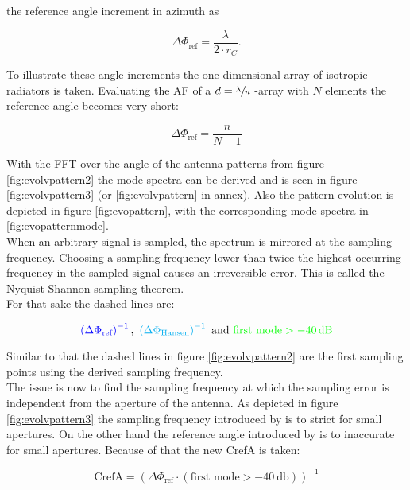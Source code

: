 the reference angle increment in azimuth as

\begin{equation}
\Delta\Phi_{\text{ref}} = \frac{\lambda}{2\cdot r_C}.
\end{equation}

To illustrate these angle increments the one dimensional array of isotropic radiators is taken. Evaluating the \ac{AF} of a $d = \sfrac{\lambda}{n}$ -array with $N$ elements the reference angle becomes very short:

\begin{equation}
\Delta\Phi_{\text{ref}} = \frac{n}{N-1}
\label{eq:1dinc}
\end{equation}

With the \ac{FFT} over the angle of the antenna patterns from figure \ref{fig:evolvpattern2} the mode spectra can be derived and is seen in figure \ref{fig:evolvpattern3} (or \ref{fig:evolvpattern} in annex). Also the pattern evolution is depicted in figure \ref{fig:evopattern}, with the corresponding mode spectra in \ref{fig:evopatternmode}.\\
When an arbitrary signal is sampled, the spectrum is mirrored at the sampling frequency. Choosing a sampling frequency lower than twice the highest occurring frequency in the sampled signal causes an irreversible error. This is called the Nyquist-Shannon sampling theorem.\\
For that sake the dashed lines are:

\begin{equation}
\color{blue}\left(\Delta\Phi_{\text{ref}}\right)^{-1}\color{black},\ \color{cyan}\left(\Delta\Phi_\text{Hansen}\right)^{-1}\color{black}\ \text{and}\ \color{green}\text{first mode} > \SI{-40}{\decibel} \color{black}
\end{equation}

Similar to that the dashed lines in figure \ref{fig:evolvpattern2} are the first sampling points using the derived sampling frequency.\\
The issue is now to find the sampling frequency at which the sampling error is independent from the aperture of the antenna. As depicted in figure \ref{fig:evolvpattern3} the sampling frequency introduced by \cite{hansen} is to strict for small apertures. On the other hand the reference angle introduced by \cite{2018arXiv180310993F} is to inaccurate for small apertures. Because of that the new \ac{CrefA} is taken:

\begin{equation}
\text{CrefA} = \left(\Delta\Phi_{\text{ref}}\cdot\left(\text{first mode} > \SI{-40}{\decibel}\right)\right)^{-1}
\end{equation} 

